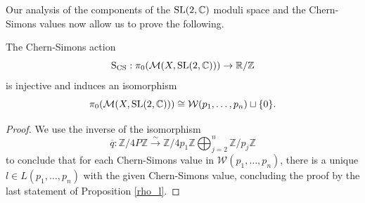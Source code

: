 %
% 
 




Our analysis of the components of the $\operatorname{SL}(2,\mathbb{C})$ moduli space and the Chern-Simons values now allow us to prove the following.

\begin{theorem} \label{ThmBrieskornSphere} The Chern-Simons action 
$$\operatorname{S_{CS}}: \pi_0(\mathcal{M}(X,\operatorname{SL}(2,\mathbb{C}))) \rightarrow \mathbb{R}/\mathbb{Z}$$ 
is injective and induces an isomorphism
$$ \pi_0(\mathcal{M}(X,\operatorname{SL}(2,\mathbb{C}))) \cong \mathcal{W}(p_1,\ldots, p_n) \sqcup \{0\}.$$
\end{theorem} 
\begin{proof}
We use the inverse of the isomorphism
$$\overline{q}: \mathbb{Z}/4P\mathbb{Z} \overset{\sim}{\rightarrow} \mathbb{Z}/4p_1\mathbb{Z} \bigoplus_{j=2}^n \mathbb{Z}/p_j\mathbb{Z}$$
to conclude that for each Chern-Simons value in $\mathcal{W}(p_1,\ldots, p_n)$, there is a unique $l\in L(p_1,\ldots, p_n)$ with the given Chern-Simons value, concluding the proof by the last statement of Proposition \ref{rho_l}.

\end{proof}

